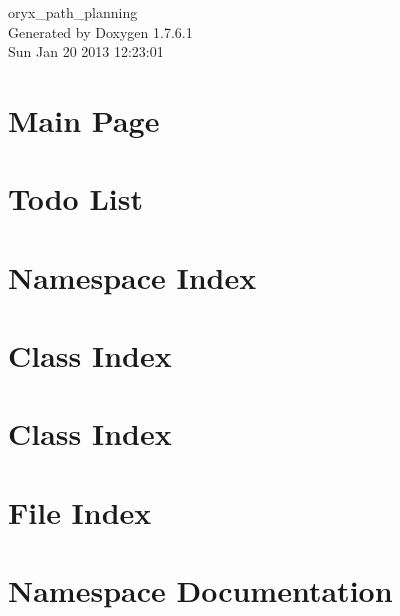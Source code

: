 \documentclass[a4paper]{book}
\begin{document}
\begin{titlepage}
\vspace*{7cm}
\begin{center}
{\Large oryx\-\_\-path\-\_\-planning }\\
\vspace*{1cm}
{\large \-Generated by Doxygen 1.7.6.1}\\
\vspace*{0.5cm}
{\small Sun Jan 20 2013 12:23:01}\\
\end{center}
\end{titlepage}
\clearemptydoublepage
{}
\tableofcontents
\clearemptydoublepage
{}
\chapter{\-Main \-Page}
\label{index}
\chapter{\-Todo \-List}
\label{todo}

\chapter{\-Namespace \-Index}

\chapter{\-Class \-Index}

\chapter{\-Class \-Index}

\chapter{\-File \-Index}

\chapter{\-Namespace \-Documentation}














\end{document}
